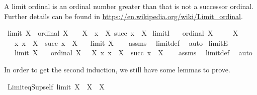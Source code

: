 \begin{isabellebody}
\begin{isamarkuptext}
A limit ordinal  is an ordinal number greater than  that is not a successor ordinal.
Further details can be found in \url{https://en.wikipedia.org/wiki/Limit_ordinal}.%
\end{isamarkuptext}\isamarkuptrue%
\isamarkupfalse%
\ {\isachardoublequoteopen}limit\ X\ {\isasymequiv}\ ordinal\ X\ {\isasymand}\ {}\ {\isasymin}\ X\ {\isasymand}\ {\isacharparenleft}{\kern0pt}{\isasymforall}x\ {\isasymin}\ X{\isachardot}{\kern0pt}\ succ\ x\ {\isasymin}\ X{\isacharparenright}{\kern0pt}{\isachardoublequoteclose}\isanewline
\isanewline
{}\isamarkupfalse%
\ limitI{\isacharcolon}{\kern0pt}\isanewline
\ \ \ {\isachardoublequoteopen}ordinal\ X{\isachardoublequoteclose}\isanewline
\ \ \ {\isachardoublequoteopen}{}\ {\isasymin}\ X{\isachardoublequoteclose}\isanewline
\ \ \ {\isachardoublequoteopen}{\isasymAnd}x{\isachardot}{\kern0pt}\ x\ {\isasymin}\ X\ {\isasymLongrightarrow}\ succ\ x\ {\isasymin}\ X{\isachardoublequoteclose}\isanewline
\ \ \ {\isachardoublequoteopen}limit\ X{\isachardoublequoteclose}\isanewline
%
\isadelimproof
\ \ %
\endisadelimproof
%
\isatagproof
{}\isamarkupfalse%
\ assms\ \isamarkupfalse%
\ limit{\isacharunderscore}{\kern0pt}def\ \isamarkupfalse%
\ auto%
\endisatagproof
{\isafoldproof}%
%
\isadelimproof
\isanewline
%
\endisadelimproof
\isanewline
{}\isamarkupfalse%
\ limitE{\isacharcolon}{\kern0pt}\isanewline
\ \ \ {\isachardoublequoteopen}limit\ X{\isachardoublequoteclose}\isanewline
\ \ \ {\isachardoublequoteopen}ordinal\ X{\isachardoublequoteclose}\ {\isachardoublequoteopen}{}\ {\isasymin}\ X{\isachardoublequoteclose}\ {\isachardoublequoteopen}{\isasymAnd}x{\isachardot}{\kern0pt}\ x\ {\isasymin}\ X\ {\isasymLongrightarrow}\ succ\ x\ {\isasymin}\ X{\isachardoublequoteclose}\isanewline
%
\isadelimproof
\ \ %
\endisadelimproof
%
\isatagproof
{}\isamarkupfalse%
\ assms\ \isamarkupfalse%
\ limit{\isacharunderscore}{\kern0pt}def\ \isamarkupfalse%
\ auto%
\endisatagproof
{\isafoldproof}%
%
\isadelimproof
%
\endisadelimproof
%
\begin{isamarkuptext}%
In order to get the second induction, we still have some lemmas to prove.%
\end{isamarkuptext}\isamarkuptrue%
\isamarkupfalse%
\ Limit{\isacharunderscore}{\kern0pt}eq{\isacharunderscore}{\kern0pt}Sup{\isacharunderscore}{\kern0pt}self{\isacharcolon}{\kern0pt}\ {\isachardoublequoteopen}limit\ X\ {\isasymLongrightarrow}\ {\isasymUnion}X\ {\isacharequal}{\kern0pt}\ X{\isachardoublequoteclose}\isanewline

\end{isabellebody}
